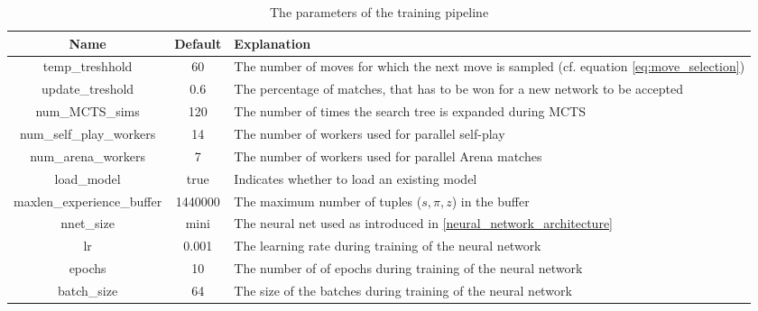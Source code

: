 \begin{table}
    \begin{center}
        \begin{tabularx}{\textwidth}{ c|c|X }
            Name                       & Default & Explanation                                                                                   \\
            \hline
            \hline
            temp\_treshhold            & 60      & The number of moves for which the next move is sampled (cf. equation \ref{eq:move_selection}) \\
            update\_treshold           & 0.6     & The percentage of matches, that has to be won for a new network to be accepted                \\
            num\_MCTS\_sims            & 120     & The number of times the search tree is expanded during MCTS                                   \\
            num\_self\_play\_workers   & 14      & The number of workers used for parallel self-play                                             \\
            num\_arena\_workers        & 7       & The number of workers used for parallel Arena matches                                         \\
            load\_model                & true    & Indicates whether to load an existing model                                                   \\
            maxlen\_experience\_buffer & 1440000 & The maximum number of tuples ($s, \pi, z$) in the buffer                                      \\
            nnet\_size                 & mini    & The neural net used as introduced in \ref{neural_network_architecture}                        \\
            lr                         & 0.001   & The learning rate during training of the neural network                                       \\
            epochs                     & 10      & The number of of epochs during training of the neural network                                 \\
            batch\_size                & 64      & The size of the batches during training of the neural network                                 \\
        \end{tabularx}
    \end{center}
    \caption{The parameters of the training pipeline}
    \label{parameters}
\end{table}

